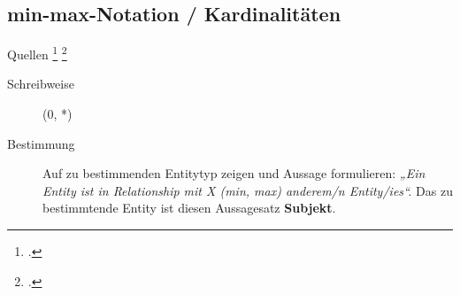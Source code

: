 \documentclass{lehramt-informatik-haupt}
\begin{document}
\subsection{min-max-Notation / Kardinalitäten}

Quellen
\footcite[2.7.3 Seite 46]{kemper}
\footcite[Seite 62]{brinda}

\begin{description}
\item[Schreibweise] (0, *)
\item[Bestimmung]

Auf zu bestimmenden Entitytyp zeigen und Aussage formulieren:
%
\emph{„Ein Entity ist in Relationship mit X (min, max) anderem/n
Entity/ies“.}
%
Das zu bestimmtende Entity ist diesen Aussagesatz \textbf{Subjekt}.
\end{description}

\literatur
\end{document}
